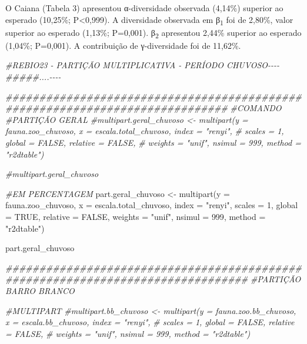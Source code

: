 \documentclass[
  letterpaper,
  DIV=11,
  numbers=noendperiod]{scrartcl}
\newenvironment{Shaded}{}{}
\newcommand{\AttributeTok}[1]{\textcolor[rgb]{0.49,0.56,0.16}{#1}}
\newcommand{\CommentTok}[1]{\textcolor[rgb]{0.38,0.63,0.69}{\textit{#1}}}
\newcommand{\ConstantTok}[1]{\textcolor[rgb]{0.53,0.00,0.00}{#1}}
\newcommand{\DecValTok}[1]{\textcolor[rgb]{0.25,0.63,0.44}{#1}}
\newcommand{\DocumentationTok}[1]{\textcolor[rgb]{0.73,0.13,0.13}{\textit{#1}}}
\newcommand{\FunctionTok}[1]{\textcolor[rgb]{0.02,0.16,0.49}{#1}}
\newcommand{\NormalTok}[1]{#1}
\newcommand{\OtherTok}[1]{\textcolor[rgb]{0.00,0.44,0.13}{#1}}
\newcommand{\StringTok}[1]{\textcolor[rgb]{0.25,0.44,0.63}{#1}}
\begin{document}
O Caiana (Tabela 3) apresentou α-diversidade observada (4,14\%) superior
ao esperado (10,25\%; P\textless0,999). A diversidade observada em
β\textsubscript{1} foi de 2,80\%, valor superior ao esperado (1,13\%;
P=0,001). β\textsubscript{2} apresentou 2,44\% superior ao esperado
(1,04\%; P=0,001). A contribuição de γ-diversidade foi de 11,62\%.

\begin{Shaded}
\begin{Highlighting}[numbers=left,,]
\CommentTok{\#REBIO23 {-} PARTIÇÃO MULTIPLICATIVA {-} PERÍODO CHUVOSO{-}{-}{-}{-}}
\DocumentationTok{\#\#\#\#\#....{-}{-}{-}{-}}

\DocumentationTok{\#\#\#\#\#\#\#\#\#\#\#\#\#\#\#\#\#\#\#\#\#\#\#\#\#\#\#\#\#\#\#\#\#\#\#\#\#\#\#\#\#\#\#\#\#\#\#\#\#\#\#\#\#\#\#\#\#\#\#\#\#\#\#\#\#\#\#\#\#\#\#\#\#\#\#\#\#}
\CommentTok{\#COMANDO}
\CommentTok{\#PARTIÇÃO GERAL}
\CommentTok{\#multipart.geral\_chuvoso \textless{}{-} multipart(y = fauna.zoo\_chuvoso, x = escala.total\_chuvoso, index = "renyi",}
\CommentTok{\#                             scales = 1, global = FALSE, relative = FALSE,}
\CommentTok{\#                             weights = "unif", nsimul = 999, method = "r2dtable")}

\CommentTok{\#multipart.geral\_chuvoso}


\CommentTok{\#EM PERCENTAGEM}
\NormalTok{part.geral\_chuvoso }\OtherTok{\textless{}{-}} \FunctionTok{multipart}\NormalTok{(}\AttributeTok{y =}\NormalTok{ fauna.zoo\_chuvoso, }\AttributeTok{x =}\NormalTok{ escala.total\_chuvoso, }\AttributeTok{index =} \StringTok{"renyi"}\NormalTok{,}
                             \AttributeTok{scales =} \DecValTok{1}\NormalTok{, }\AttributeTok{global =} \ConstantTok{TRUE}\NormalTok{, }\AttributeTok{relative =} \ConstantTok{FALSE}\NormalTok{,}
                             \AttributeTok{weights =} \StringTok{"unif"}\NormalTok{, }\AttributeTok{nsimul =} \DecValTok{999}\NormalTok{, }\AttributeTok{method =} \StringTok{"r2dtable"}\NormalTok{)}

\NormalTok{part.geral\_chuvoso}

\DocumentationTok{\#\#\#\#\#\#\#\#\#\#\#\#\#\#\#\#\#\#\#\#\#\#\#\#\#\#\#\#\#\#\#\#\#\#\#\#\#\#\#\#\#\#\#\#\#\#\#\#\#\#\#\#\#\#\#\#\#\#\#\#\#\#\#\#\#\#\#\#\#\#\#\#\#\#\#\#\#\#\#\#}
\CommentTok{\#PARTIÇÃO BARRO BRANCO}

\CommentTok{\#MULTIPART}
\CommentTok{\#multipart.bb\_chuvoso \textless{}{-} multipart(y = fauna.zoo.bb\_chuvoso, x = escala.bb\_chuvoso, index = "renyi",}
\CommentTok{\#                          scales = 1, global = FALSE, relative = FALSE,}
\CommentTok{\#                          weights = "unif", nsimul = 999, method = "r2dtable")}


\end{Highlighting}
\end{Shaded}
\end{document}
